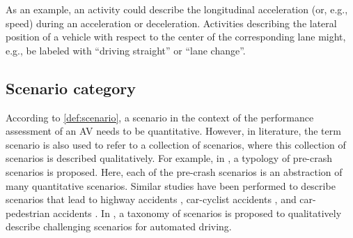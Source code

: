 
\cstartf As an example, an activity could describe the longitudinal acceleration (or, e.g., speed) during an acceleration or deceleration. \cendf
Activities describing the lateral position of a vehicle with respect to the center of the corresponding lane might, e.g., be labeled with ``driving straight'' or ``lane change''.




\subsection{Scenario category}
\label{sec:scenario category}

\cstartd According to \cendd \cref{def:scenario}, a scenario in the context of the performance assessment of an AV needs to be quantitative. 
However, in literature, the term scenario is also used to refer to a collection of scenarios, where this collection of scenarios is described \cstartd qualitatively\cendd. For example, in \autocite{USDoT2007precrashscenarios}, a typology of pre-crash scenarios is proposed. Here, each of the pre-crash scenarios is an abstraction of many quantitative scenarios. Similar studies have been performed to describe scenarios that lead to highway accidents \autocite{adaptive2017d73}, car-cyclist accidents \autocite{opdencamp2014cats}, and car-pedestrian accidents \autocite{lenard2014typical}. In \autocite{catapult2017taxonomy}, a taxonomy of scenarios is proposed to qualitatively describe challenging scenarios for automated driving.

